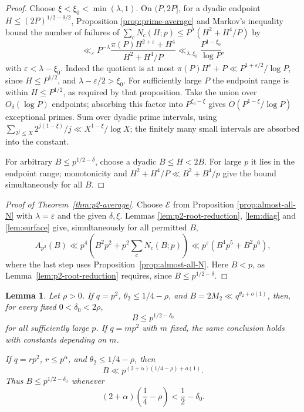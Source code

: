 \documentclass[12pt, a4paper]{amsart}
\numberwithin{equation}{section}
\newcommand{\ep}{\varepsilon}
\renewcommand{\le}{\leqslant}
\theoremstyle{plain}
\newtheorem{lem}{Lemma}[section]
\begin{document}
\begin{proof}
Choose $\xi<\xi_0<\min(\lambda,1)$. On $(P,2P]$, for a dyadic endpoint $H\le (2P)^{1/2-\delta/2}$, Proposition \ref{prop:prime-average} and Markov's inequality bound the number of failures of $\sum_cN_c(H;p)\le P^\lambda(H^2+H^4/P)$ by
$$
\ll_\ep P^{-\lambda}
\frac{\pi(P)H^{2+\ep}+H^4}{H^2+H^4/P}
\ll_{\lambda,\xi_0} \frac{P^{1-\xi_0}}{\log P},
$$
with $\ep<\lambda-\xi_0$. Indeed the quotient is at most $\pi(P)H^\ep+P\ll P^{1+\ep/2}/\log P$, since $H\le P^{1/2}$, and $\lambda-\ep/2>\xi_0$. For sufficiently large $P$ the endpoint range is within $H\le P^{1/2}$, as required by that proposition. Take the union over $O_\delta(\log P)$ endpoints; absorbing this factor into $P^{\xi_0-\xi}$ gives $O(P^{1-\xi}/\log P)$ exceptional primes. Sum over dyadic prime intervals, using $\sum_{2^j\le X}2^{j(1-\xi)}/j\ll X^{1-\xi}/\log X$; the finitely many small intervals are absorbed into the constant.

For arbitrary $B\le p^{1/2-\delta}$, choose a dyadic $B\le H<2B$. For large $p$ it lies in the endpoint range; monotonicity and $H^2+H^4/P\ll B^2+B^4/p$ give the bound simultaneously for all $B$.
\end{proof}

\begin{proof}[Proof of Theorem~\ref{thm:p2-average}]
Choose $\mathcal E$ from Proposition \ref{prop:almost-all-N} with $\lambda=\ep$ and the given $\delta,\xi$. Lemmas \ref{lem:p2-root-reduction}, \ref{lem:diag} and \ref{lem:surface} give, simultaneously for all permitted $B$,
$$
A_{p^2}(B)\ll p^4\left(B^2p^2+p^2\sum_cN_c(B;p)\right)\ll p^{\ep}(B^4p^5+B^2p^6),
$$
where the last step uses Proposition~\ref{prop:almost-all-N}. Here $B<p$, as Lemma~\ref{lem:p2-root-reduction} requires, since $B\le p^{1/2-\delta}$.
\end{proof}

\begin{lem}\label{lem:p2-range-dependencies}
Let $\rho>0$. If $q=p^2$, $\theta_2\le1/4-\rho$, and $B=2M_2\ll q^{\theta_2+o(1)}$, then, for every fixed $0<\delta_0<2\rho$,
$$
B\le p^{1/2-\delta_0}
$$
for all sufficiently large $p$. If $q=mp^2$ with $m$ fixed, the same conclusion holds with constants depending on $m$.

If $q=rp^2$, $r\le p^\alpha$, and $\theta_2\le1/4-\rho$, then
$$
B\ll p^{(2+\alpha)(1/4-\rho)+o(1)}.
$$
Thus $B\le p^{1/2-\delta_0}$ whenever
$$
(2+\alpha)\left(\frac{1}{4}-\rho\right)<\frac{1}{2}-\delta_0.
$$
\end{lem}
\end{document}
